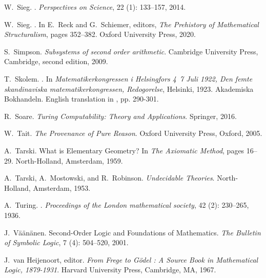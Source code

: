 \documentclass[11pt,fleqn,leqno]{article}
\begin{document}
\begin{thebibliography}{118}
W.~Sieg.
.
\newblock \emph{Perspectives on Science}, 22 (1): 133--157,
  2014.

W.~Sieg.
.
\newblock In E.~Reck and G.~Schiemer, editors, \emph{The Prehistory of
  Mathematical Structuralism}, pages 352--382. Oxford University Press, 2020.

S.~Simpson.
\newblock \emph{Subsystems of second order arithmetic}.
\newblock Cambridge University Press, Cambridge, second edition, 2009.

T.~Skolem.
.
\newblock In \emph{{Matematikerkongressen i Helsingfors 4~7 Juli 1922, Den
  femte skandinaviska matematikerkongressen, Redogorelse}}, Helsinki, 1923.
  Akademiska Bokhandeln.
\newblock English translation in \citep{Heijenoort1967}, pp. 290-301.

R.~Soare.
\newblock \emph{Turing Computability: Theory and Applications}.
\newblock Springer, 2016.

W.~Tait.
\newblock \emph{The {P}rovenance of {P}ure {R}eason}.
\newblock Oxford University Press, Oxford, 2005.

A.~Tarski.
\newblock What is {E}lementary {G}eometry?
\newblock In \emph{The Axiomatic Method}, pages 16--29. North-Holland,
  Amsterdam, 1959.

A.~Tarski, A.~Mostowski, and R.~Robinson.
\newblock \emph{Undecidable {T}heories}.
\newblock North-Holland, Amsterdam, 1953.

A.~Turing.
.
\newblock \emph{Proceedings of the London mathematical society}, 42
  (2): 230--265, 1936.

J.~V{\"a}{\"a}n{\"a}nen.
\newblock Second-{O}rder {L}ogic and {F}oundations of {M}athematics.
\newblock \emph{The Bulletin of Symbolic Logic}, 7 (4):
  504--520, 2001.

J.~van Heijenoort, editor.
\newblock \emph{From {F}rege to {G}\"odel : {A} {S}ource {B}ook in
  {M}athematical {L}ogic, 1879-1931}.
\newblock Harvard University Press, Cambridge, MA, 1967.


\end{thebibliography}
\end{document}
